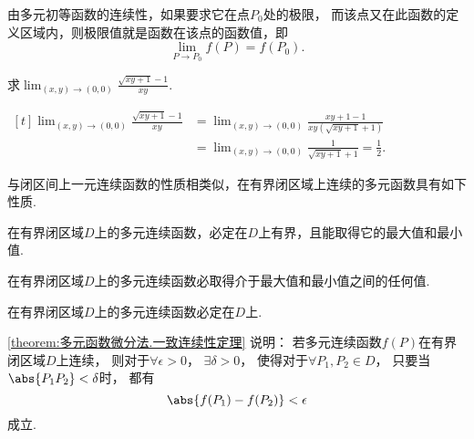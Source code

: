 由多元初等函数的连续性，如果要求它在点\(P_0\)处的极限，
而该点又在此函数的定义区域内，则极限值就是函数在该点的函数值，即\begin{equation*}
	\lim_{P \to P_0} f(P) = f(P_0).
\end{equation*}

\begin{example}
\def\l{\lim_{(x,y)\to(0,0)}}
求\(\l \frac{\sqrt{xy+1}-1}{xy}\).
\begin{solution}
\(\begin{aligned}[t]
\l \frac{\sqrt{xy+1}-1}{xy}
&= \l \frac{xy+1-1}{xy(\sqrt{xy+1}+1)} \\
&= \l \frac{1}{\sqrt{xy+1}+1}
= \frac{1}{2}.
\end{aligned}\)
\end{solution}
\end{example}

与闭区间上一元连续函数的性质相类似，在有界闭区域上连续的多元函数具有如下性质.

\begin{property}[有界性与最值定理]\label{theorem:多元函数微分法.有界性与最值定理}
在有界闭区域\(D\)上的多元连续函数，必定在\(D\)上有界，且能取得它的最大值和最小值.
\end{property}

\begin{property}[介值定理]\label{theorem:多元函数微分法.介值定理}
在有界闭区域\(D\)上的多元连续函数必取得介于最大值和最小值之间的任何值.
\end{property}

\begin{property}[一致连续性定理]\label{theorem:多元函数微分法.一致连续性定理}
在有界闭区域\(D\)上的多元连续函数必定在\(D\)上.
\end{property}
\cref{theorem:多元函数微分法.一致连续性定理} 说明：
若多元连续函数\(f(P)\)在有界闭区域\(D\)上连续，
则对于\(\forall \epsilon > 0\)，
\(\exists \delta > 0\)，
使得对于\(\forall P_1,P_2 \in D\)，
只要当\(\abs{P_1P_2}<\delta\)时，
都有\begin{equation*}
	\abs{f(P_1)-f(P_2)} < \epsilon
\end{equation*}成立.
